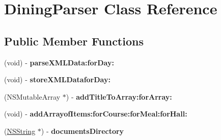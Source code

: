 \hypertarget{interface_dining_parser}{
\section{DiningParser Class Reference}
\label{interface_dining_parser}
}
\subsection*{Public Member Functions}
\begin{DoxyCompactItemize}
\item 
\hypertarget{interface_dining_parser_ad1cd6dd8634c959a36b254cb8c2b1bc0}{
(void) -\/ {\bfseries parseXMLData:forDay:}}
\label{interface_dining_parser_ad1cd6dd8634c959a36b254cb8c2b1bc0}

\item 
\hypertarget{interface_dining_parser_a10412c2e64bb008cd459c80f8b6aaf14}{
(void) -\/ {\bfseries storeXMLDataforDay:}}
\label{interface_dining_parser_a10412c2e64bb008cd459c80f8b6aaf14}

\item 
\hypertarget{interface_dining_parser_adcc6e3511cb692ec2df52cf7c32a47f0}{
(NSMutableArray $\ast$) -\/ {\bfseries addTitleToArray:forArray:}}
\label{interface_dining_parser_adcc6e3511cb692ec2df52cf7c32a47f0}

\item 
\hypertarget{interface_dining_parser_a20161fb14e91e3439c2283b99d560fa7}{
(void) -\/ {\bfseries addArrayofItems:forCourse:forMeal:forHall:}}
\label{interface_dining_parser_a20161fb14e91e3439c2283b99d560fa7}

\item 
\hypertarget{interface_dining_parser_a53024594987e7e5c51a5f77882f19cfb}{
(\hyperlink{class_n_s_string}{NSString} $\ast$) -\/ {\bfseries documentsDirectory}}
\label{interface_dining_parser_a53024594987e7e5c51a5f77882f19cfb}

\end{DoxyCompactItemize}
